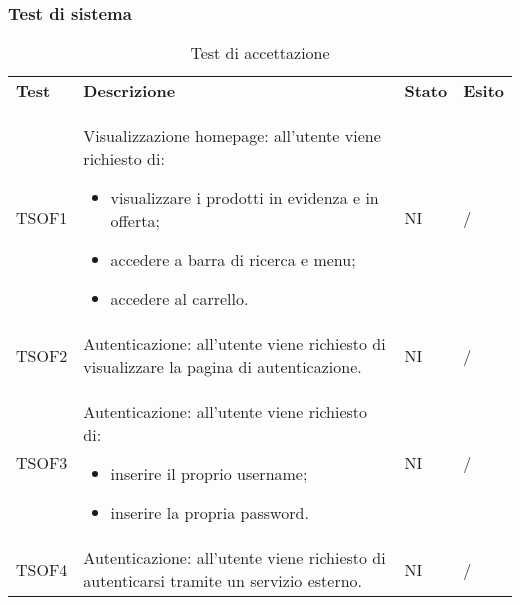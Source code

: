 \subsubsection{Test di sistema}
\begin{center}
    \centering
    \renewcommand{\arraystretch}{1.8}
    \label{tab:TestSistema}
    \begin{longtable}[!h]{p{60px} p{240px} p{35px} p{35px}}
        \caption{Test di accettazione}                                                                                                                                                                                                           \\
        \rowcolor{logo!70} \textbf{Test} & \textbf{Descrizione}                                                                                                                                                & \textbf{Stato} & \textbf{Esito} \\
        TSOF1                            & Visualizzazione homepage: all'utente viene richiesto di: \begin{itemize} \item visualizzare i prodotti in evidenza e in offerta; \item accedere a barra di ricerca e menu; \item accedere al carrello. \end{itemize}                                                                                  & NI             & /             \\
        TSOF2                            & Autenticazione: all'utente viene richiesto di visualizzare la pagina di autenticazione.                                                                             & NI             & /             \\
        TSOF3                            & Autenticazione: all'utente viene richiesto di: \begin{itemize} \item inserire il proprio username; \item inserire la propria password. \end{itemize}                                                                                            & NI             & /             \\
        TSOF4                            & Autenticazione: all'utente viene richiesto di autenticarsi tramite un servizio esterno.                                                                             & NI             & /             \\

\end{longtable}
\end{center}
